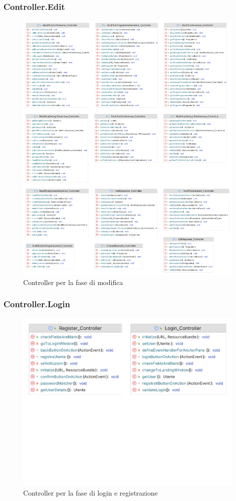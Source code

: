 \subsubsection{Controller.Edit}
\begin{figure}[h!]
	\includegraphics[scale=0.17]{Immagini/Controller_Modifica.png}
	\caption{Controller per la fase di modifica}
\end{figure}

\subsubsection{Controller.Login}
\begin{figure}[h!]
	\includegraphics[scale=0.2]{Immagini/Controller_Login.png}
	\caption{Controller per la fase di login e registrazione}
\end{figure}

